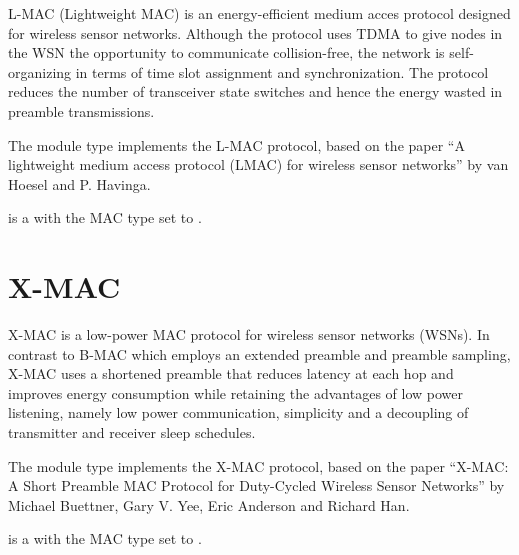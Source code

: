 L-MAC (Lightweight MAC) is an energy-efficient medium acces protocol designed 
for wireless sensor networks. Although the protocol uses TDMA to give nodes 
in the WSN the opportunity to communicate collision-free, the network is
self-organizing in terms of time slot assignment and synchronization. 
The protocol reduces the number of transceiver state switches and hence
the energy wasted in preamble transmissions.

The  module type implements the L-MAC protocol, based on the
paper ``A lightweight medium access protocol (LMAC) for wireless sensor networks''
by van Hoesel and P. Havinga.

 is a  with the MAC type
set to .


\section{X-MAC}
\label{sec:xmac}

X-MAC is a low-power MAC protocol for wireless sensor networks (WSNs).
In contrast to B-MAC which employs an extended preamble and preamble sampling,
X-MAC uses a shortened preamble that reduces latency at each hop and 
improves energy consumption while retaining the advantages 
of low power listening, namely low power communication, simplicity 
and a decoupling of transmitter and receiver sleep schedules.
 
The  module type implements the X-MAC protocol, based on
the paper ``X-MAC: A Short Preamble MAC Protocol for Duty-Cycled 
Wireless Sensor Networks'' by Michael Buettner, Gary V. Yee, Eric Anderson
and Richard Han.

 is a  with the MAC type
set to .



